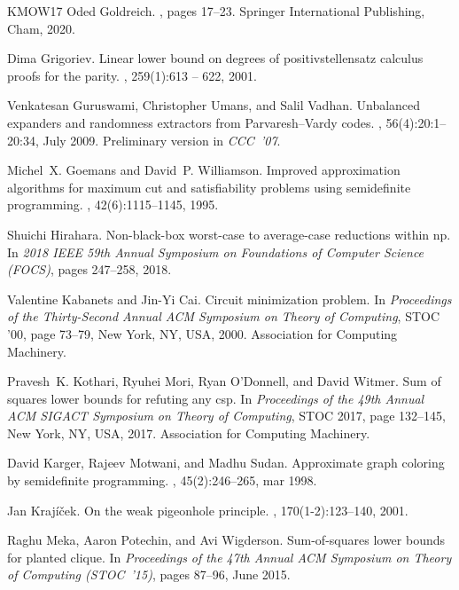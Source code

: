 \documentclass[10pt,a4paper]{article}
\theoremstyle{plain}
\theoremstyle{remark}
\theoremstyle{definition}
\begin{document}
\begin{thebibliography}{KMOW17}
Oded Goldreich.
,
  pages 17--23.
\newblock Springer International Publishing, Cham, 2020.

Dima Grigoriev.
\newblock Linear lower bound on degrees of positivstellensatz calculus proofs
  for the parity.
, 259(1):613 -- 622, 2001.

Venkatesan Guruswami, Christopher Umans, and Salil Vadhan.
\newblock Unbalanced expanders and randomness extractors from
  {P}arvaresh--{V}ardy codes.
, 56(4):20:1\nobreakdash--20:34, July 2009.
\newblock Preliminary version in \emph{CCC~'07}.

Michel~X. Goemans and David~P. Williamson.
\newblock Improved approximation algorithms for maximum cut and satisfiability
  problems using semidefinite programming.
, 42(6):1115--1145, 1995.

Shuichi Hirahara.
\newblock Non-black-box worst-case to average-case reductions within np.
\newblock In {\em 2018 IEEE 59th Annual Symposium on Foundations of Computer
  Science (FOCS)}, pages 247--258, 2018.

Valentine Kabanets and Jin-Yi Cai.
\newblock Circuit minimization problem.
\newblock In {\em Proceedings of the Thirty-Second Annual ACM Symposium on
  Theory of Computing}, STOC '00, page 73–79, New York, NY, USA, 2000.
  Association for Computing Machinery.

Pravesh~K. Kothari, Ryuhei Mori, Ryan O’Donnell, and David Witmer.
\newblock Sum of squares lower bounds for refuting any csp.
\newblock In {\em Proceedings of the 49th Annual ACM SIGACT Symposium on Theory
  of Computing}, STOC 2017, page 132–145, New York, NY, USA, 2017.
  Association for Computing Machinery.

David Karger, Rajeev Motwani, and Madhu Sudan.
\newblock Approximate graph coloring by semidefinite programming.
, 45(2):246–265, mar 1998.

Jan Krajíček.
\newblock On the weak pigeonhole principle.
, 170(1-2):123--140, 2001.

Raghu Meka, Aaron Potechin, and Avi Wigderson.
\newblock Sum-of-squares lower bounds for planted clique.
\newblock In {\em Proceedings of the 47th Annual ACM Symposium on Theory of
  Computing ({STOC}~'15)}, pages 87\nobreakdash--96, June 2015.


\end{thebibliography}
\end{document}
